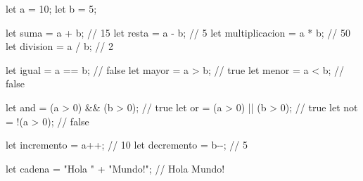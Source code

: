 \documentclass[
  a4paper,
  DIV=11,
  numbers=noendperiod,
  onepage,
  openany]{scrreprt}
\newenvironment{Shaded}{\begin{snugshade}}{\end{snugshade}}
\newcommand{\CommentTok}[1]{\textcolor[rgb]{0.37,0.37,0.37}{#1}}
\newcommand{\DecValTok}[1]{\textcolor[rgb]{0.68,0.00,0.00}{#1}}
\newcommand{\KeywordTok}[1]{\textcolor[rgb]{0.00,0.23,0.31}{#1}}
\newcommand{\NormalTok}[1]{\textcolor[rgb]{0.00,0.23,0.31}{#1}}
\newcommand{\OperatorTok}[1]{\textcolor[rgb]{0.37,0.37,0.37}{#1}}
\newcommand{\StringTok}[1]{\textcolor[rgb]{0.13,0.47,0.30}{#1}}
\begin{document}
\begin{Shaded}
\begin{Highlighting}[]
\KeywordTok{let}\NormalTok{ a }\OperatorTok{=} \DecValTok{10}\OperatorTok{;}
\KeywordTok{let}\NormalTok{ b }\OperatorTok{=} \DecValTok{5}\OperatorTok{;}

\KeywordTok{let}\NormalTok{ suma }\OperatorTok{=}\NormalTok{ a }\OperatorTok{+}\NormalTok{ b}\OperatorTok{;} \CommentTok{// 15}
\KeywordTok{let}\NormalTok{ resta }\OperatorTok{=}\NormalTok{ a }\OperatorTok{{-}}\NormalTok{ b}\OperatorTok{;} \CommentTok{// 5}
\KeywordTok{let}\NormalTok{ multiplicacion }\OperatorTok{=}\NormalTok{ a }\OperatorTok{*}\NormalTok{ b}\OperatorTok{;} \CommentTok{// 50}
\KeywordTok{let}\NormalTok{ division }\OperatorTok{=}\NormalTok{ a }\OperatorTok{/}\NormalTok{ b}\OperatorTok{;} \CommentTok{// 2}

\KeywordTok{let}\NormalTok{ igual }\OperatorTok{=}\NormalTok{ a }\OperatorTok{==}\NormalTok{ b}\OperatorTok{;} \CommentTok{// false}
\KeywordTok{let}\NormalTok{ mayor }\OperatorTok{=}\NormalTok{ a }\OperatorTok{\textgreater{}}\NormalTok{ b}\OperatorTok{;} \CommentTok{// true}
\KeywordTok{let}\NormalTok{ menor }\OperatorTok{=}\NormalTok{ a }\OperatorTok{\textless{}}\NormalTok{ b}\OperatorTok{;} \CommentTok{// false}

\KeywordTok{let}\NormalTok{ and }\OperatorTok{=}\NormalTok{ (a }\OperatorTok{\textgreater{}} \DecValTok{0}\NormalTok{) }\OperatorTok{\&\&}\NormalTok{ (b }\OperatorTok{\textgreater{}} \DecValTok{0}\NormalTok{)}\OperatorTok{;} \CommentTok{// true}
\KeywordTok{let}\NormalTok{ or }\OperatorTok{=}\NormalTok{ (a }\OperatorTok{\textgreater{}} \DecValTok{0}\NormalTok{) }\OperatorTok{||}\NormalTok{ (b }\OperatorTok{\textgreater{}} \DecValTok{0}\NormalTok{)}\OperatorTok{;} \CommentTok{// true}
\KeywordTok{let}\NormalTok{ not }\OperatorTok{=} \OperatorTok{!}\NormalTok{(a }\OperatorTok{\textgreater{}} \DecValTok{0}\NormalTok{)}\OperatorTok{;} \CommentTok{// false}

\KeywordTok{let}\NormalTok{ incremento }\OperatorTok{=}\NormalTok{ a}\OperatorTok{++;} \CommentTok{// 10}
\KeywordTok{let}\NormalTok{ decremento }\OperatorTok{=}\NormalTok{ b}\OperatorTok{{-}{-};} \CommentTok{// 5}

\KeywordTok{let}\NormalTok{ cadena }\OperatorTok{=} \StringTok{"Hola "} \OperatorTok{+} \StringTok{"Mundo!"}\OperatorTok{;} \CommentTok{// Hola Mundo!}
\end{Highlighting}
\end{Shaded}
\end{document}
